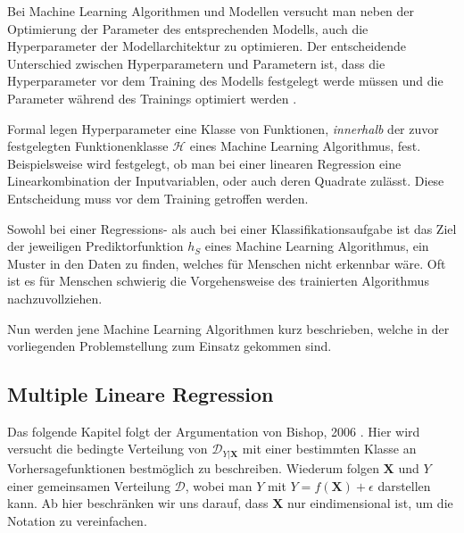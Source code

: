 Bei Machine Learning Algorithmen und Modellen versucht man neben der Optimierung der Parameter des entsprechenden Modells,
auch die Hyperparameter der Modellarchitektur zu optimieren. Der entscheidende Unterschied zwischen Hyperparametern
und Parametern ist, dass die Hyperparameter vor dem Training des Modells festgelegt werde m\"ussen und die Parameter w\"ahrend des Trainings
optimiert werden \cite{hyper}.

Formal legen Hyperparameter eine Klasse von Funktionen, \textit{innerhalb} der zuvor festgelegten Funktionenklasse $\mathcal{H}$ eines Machine
Learning Algorithmus, fest. Beispielsweise wird festgelegt, ob man bei einer linearen Regression eine Linearkombination der Inputvariablen, oder auch deren Quadrate
zul\"asst. Diese Entscheidung muss vor dem Training getroffen werden.

Sowohl bei einer Regressions- als auch bei einer Klassifikationsaufgabe ist das Ziel der jeweiligen Prediktorfunktion $h_S$ eines Machine Learning Algorithmus,
ein Muster in den Daten zu finden, welches f\"ur Menschen nicht erkennbar w\"are. Oft ist es f\"ur Menschen schwierig die Vorgehensweise des trainierten Algorithmus
nachzuvollziehen.

Nun werden jene Machine Learning Algorithmen kurz beschrieben, welche in der vorliegenden Problemstellung zum Einsatz gekommen sind.





























\subsection{Multiple Lineare Regression}

Das folgende Kapitel folgt der Argumentation von Bishop, 2006 \cite[Kapitel 3.1]{bishop}. Hier wird versucht die bedingte Verteilung von $\mathcal{D}_{Y|\mathbf{X}}$ mit einer bestimmten Klasse an Vorhersagefunktionen bestm\"oglich zu beschreiben.
Wiederum folgen $\mathbf{X}$ und $Y$ einer gemeinsamen Verteilung $\mathcal{D}$, wobei man $Y$ mit $Y = f(\mathbf{X}) + \epsilon$ darstellen kann.
Ab hier beschränken wir uns darauf, dass $\mathbf{X}$ nur eindimensional ist, um die Notation zu vereinfachen.

